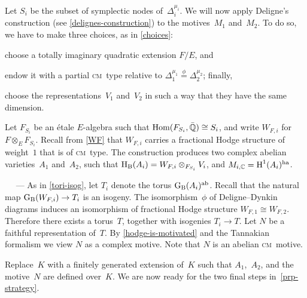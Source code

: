 \documentclass[10pt,twoside,leqno]{article}
\renewcommand{\paragraph}[1]{\par\bigskip\refstepcounter{subsection}%
 {\normalfont\normalsize\scshape\noindent\thesubsection%
 \ifthenelse{\equal{#1}{}}%
 {}%
 {\ \textls{#1.}}%
 \ ---}%
}
\numberwithin{equation}{subsection}
\newcommand{\Hom}{\textnormal{Hom}}
\newcommand{\QQ}{\mathbb{Q}}
\newcommand{\QQbar}{\bar{\QQ}}
\newcommand{\CC}{\mathbb{C}}
\newcommand{\ab}{\textnormal{ab}}
\newcommand{\ha}{\textnormal{ha}}
\newcommand{\HH}{\textnormal{H}}
\newcommand{\HB}{\HH_{\textnormal{B}}}
\newcommand{\GG}{\textnormal{G}}
\newcommand{\GB}{\GG_{\textnormal{B}}}
\newcommand{\cm}{\textsc{cm}}
\begin{document}
Let $S_i$ be the subset of symplectic nodes of~$\Delta_i^{\mu_i}$.
We will now apply Deligne's construction (see \cref{delignes-construction})
to the motives~$M_1$ and~$M_2$.
To do so, we have to make three choices, as in \cref{choices}:
\begin{enumerate*}[label=(\textit{\roman*})]
\item choose a totally imaginary quadratic extension $F/E$, and
\item endow it with a partial \cm~type
 relative to $\Delta_1^{\mu_1} \stackrel{\phi}{=} \Delta_2^{\mu_2}$;
 finally,
\item choose the representations~$V_1$ and~$V_2$
 in such a way that they have the same dimension.
\end{enumerate*}
Let $F_{S_i}$ be an \'etale $E$-algebra such that
$\Hom(F_{S_i},\QQbar) \cong S_i$,
and write $W_{F,i}$ for $F \otimes_E F_{S_i}$.
Recall from \cref{WF} that $W_{F,i}$ carries a
fractional Hodge structure of weight~$1$ that is of \cm~type.
The construction produces two complex abelian varieties~$A_1$ and~$A_2$,
such that $\HB(A_i) = W_{F,i} \otimes_{F_{S_i}} V_i$,
and $M_{i,\CC} = \HH^1(A_i)^\ha$.

\paragraph{} %
As in \cref{tori-isog}, let $T_i$ denote the torus $\GB(A_i)^\ab$.
Recall that the natural map $\GB(W_{F,i}) \to T_i$ is an isogeny.
The isomorphism~$\phi$ of Deligne--Dynkin diagrams
induces an isomorphism of fractional Hodge structure $W_{F,1} \cong W_{F,2}$.
Therefore there exists a torus~$T$,
together with isogenies $T_i \to T$.
Let $N$ be a faithful representation of~$T$.
By \cref{hodge-is-motivated} and the Tannakian formalism
we view $N$ as a complex motive.
Note that $N$ is an abelian \cm~motive.

Replace~$K$ with a finitely generated extension of~$K$
such that $A_1$,~$A_2$, and the motive~$N$ are defined over~$K$.
We are now ready for the two final steps in~\cref{prp-strategy}.
\end{document}
